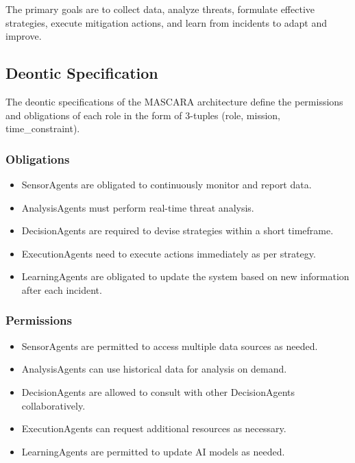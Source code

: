 \documentclass[conference]{IEEEtran}
\begin{document}
The primary goals are to collect data, analyze threats, formulate effective strategies, execute mitigation actions, and learn from incidents to adapt and improve.

\subsection*{Deontic Specification}

The deontic specifications of the MASCARA architecture define the permissions and obligations of each role in the form of 3-tuples (role, mission, time\_constraint).

\subsubsection*{Obligations}

\begin{itemize}
    \item SensorAgents are obligated to continuously monitor and report data.
    \item AnalysisAgents must perform real-time threat analysis.
    \item DecisionAgents are required to devise strategies within a short timeframe.
    \item ExecutionAgents need to execute actions immediately as per strategy.
    \item LearningAgents are obligated to update the system based on new information after each incident.
\end{itemize}

\subsubsection*{Permissions}

\begin{itemize}
    \item SensorAgents are permitted to access multiple data sources as needed.
    \item AnalysisAgents can use historical data for analysis on demand.
    \item DecisionAgents are allowed to consult with other DecisionAgents collaboratively.
    \item ExecutionAgents can request additional resources as necessary.
    \item LearningAgents are permitted to update AI models as needed.
\end{itemize}
\end{document}
